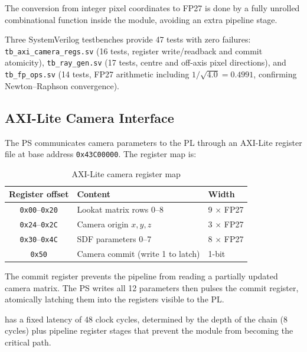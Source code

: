 The conversion from integer pixel coordinates to FP27 is done by a fully
unrolled combinational function  inside the module, avoiding
an extra pipeline stage.

Three SystemVerilog testbenches provide 47 tests with zero failures: \texttt{tb\_axi\_camera\_regs.sv} (16 tests, register write/readback and commit atomicity), \texttt{tb\_ray\_gen.sv} (17 tests, centre and off-axis pixel directions), and \texttt{tb\_fp\_ops.sv} (14 tests, FP27 arithmetic including $1/\sqrt{4.0} = 0.4991$, confirming Newton--Raphson convergence).

\subsection{AXI-Lite Camera Interface}

The PS communicates camera parameters to the PL through an AXI-Lite register
file at base address \texttt{0x43C00000}. The register map is:

\begin{table}[htbp]
\centering
\small
\caption{AXI-Lite camera register map}
\label{tab:axi_regs}
{\renewcommand{\arraystretch}{1.3}
\begin{tabular}{cll}
\toprule
\textbf{Register offset} & \textbf{Content} & \textbf{Width} \\
\midrule
\texttt{0x00}--\texttt{0x20} & Lookat matrix rows 0--8 & 9 $\times$ FP27 \\
\texttt{0x24}--\texttt{0x2C} & Camera origin $x, y, z$ & 3 $\times$ FP27 \\
\texttt{0x30}--\texttt{0x4C} & SDF parameters 0--7     & 8 $\times$ FP27 \\
\texttt{0x50} & Camera commit (write 1 to latch)       & 1-bit \\
\bottomrule
\end{tabular}}
\end{table}

\FloatBarrier

The commit register prevents the pipeline from reading a partially updated
camera matrix. The PS writes all 12 parameters then pulses the commit register,
atomically latching them into the registers visible to the PL.

 has a fixed latency of 48 clock cycles, determined by the depth
of the  chain (8 cycles) plus pipeline register stages
that prevent the module from becoming the critical path.


\FloatBarrier


